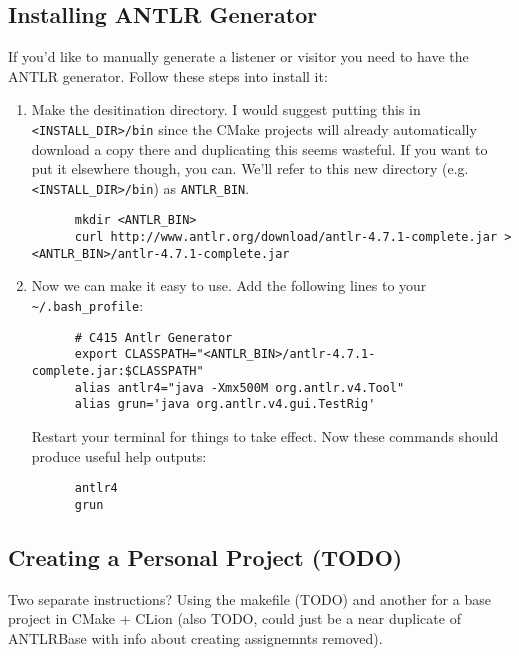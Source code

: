 \documentclass[../setup.tex]{subfiles}
\begin{document}
\subsection{Installing ANTLR Generator}
If you'd like to manually generate a listener or visitor you need to have the ANTLR generator.
Follow these steps into install it:
\begin{enumerate}
  \item
    Make the desitination directory. I would suggest putting this in \lstinline{<INSTALL_DIR>/bin}
    since the CMake projects will already automatically download a copy there and duplicating
    this seems wasteful. If you want to put it elsewhere though, you can. We'll refer to this new
    directory (e.g. \lstinline{<INSTALL_DIR>/bin}) as \lstinline{ANTLR_BIN}.
    \begin{lstlisting}
      mkdir <ANTLR_BIN>
      curl http://www.antlr.org/download/antlr-4.7.1-complete.jar > <ANTLR_BIN>/antlr-4.7.1-complete.jar
    \end{lstlisting}
  \item
    Now we can make it easy to use. Add the following lines to your \lstinline{~/.bash_profile}:
    \begin{lstlisting}
      # C415 Antlr Generator
      export CLASSPATH="<ANTLR_BIN>/antlr-4.7.1-complete.jar:$CLASSPATH"
      alias antlr4="java -Xmx500M org.antlr.v4.Tool"
      alias grun='java org.antlr.v4.gui.TestRig'
    \end{lstlisting}
    Restart your terminal for things to take effect. Now these commands should produce useful help
    outputs:
    \begin{lstlisting}
      antlr4
      grun
    \end{lstlisting}
\end{enumerate}

\subsection{Creating a Personal Project (TODO)}
Two separate instructions? Using the makefile (TODO) and another for a base project in CMake +
CLion (also TODO, could just be a near duplicate of ANTLRBase with info about creating assignemnts
removed).
\end{document}
